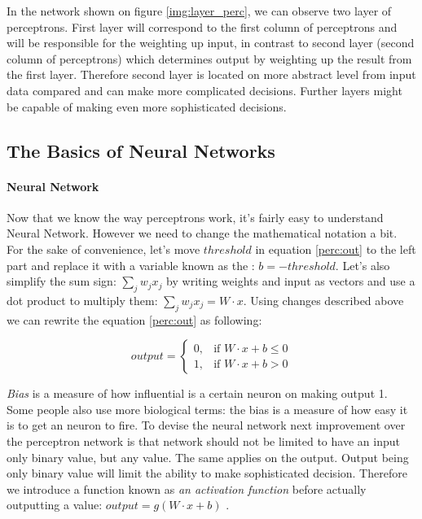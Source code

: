 In the network shown on figure \ref{img:layer_perc}, we can observe
two layer of perceptrons. First layer will correspond to the first column of perceptrons
and will be responsible for the weighting up input, in contrast to second layer
(second column of perceptrons) which determines output by weighting up the result from
the first layer. Therefore second layer is located on more abstract level from input data
compared and can make more complicated decisions. Further layers might be capable
of making even more sophisticated decisions.
\subsection{The Basics of Neural Networks}

\paragraph{Neural Network} Now that we know the way perceptrons work,
it's fairly easy to understand Neural Network. However we need to change
the mathematical notation a bit. For the sake of convenience, let's move
$threshold$ in equation \ref{perc:out} to the left part and replace it
with a variable known as the  : $b = -threshold$. Let's also simplify
the sum sign: $\sum_j w_j x_j$ by writing weights and input as vectors and use a dot product
to multiply them:
$\sum_j w_j x_j = W \cdot x$. Using changes described above we can rewrite the
equation \ref{perc:out} as following:

\begin{equation} \label{perc:with_bias}
	output = \begin{cases} 0, & \mbox{if } W \cdot x + b\leq 0 \\ 1, & \mbox{if } W \cdot x + b > 0 \end{cases}
\end{equation}

\emph{Bias} is a measure of how influential is a certain neuron on making output 1.
Some people also use more biological terms: the bias is a measure of how easy it is
to get an neuron to fire. To devise the neural network
next improvement over the perceptron network is that network should not be limited
to have an input only binary value, but any value. The same applies on the output.
Output being only binary value will limit the ability to make sophisticated decision.
Therefore we introduce a function known as \emph{an activation function} before
actually outputting a value: $output = g( W \cdot x + b)$ \cite{Nielsen2015} .

